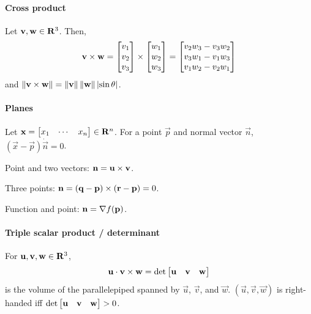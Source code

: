 \documentclass[10pt,landscape]{article}
\begin{document}
\begin{multicols*}{3}
\paragraph{Cross product}
Let $\mathbf{v}, \mathbf{w} \in \mathbf{R}^3$.
Then,
\begin{equation}
  \label{eq:crossproduct}
  \mathbf{v} \times \mathbf{w} = \begin{bmatrix} v_1 \\ v_2 \\ v_3 \end{bmatrix} \times \begin{bmatrix} w_1 \\ w_2 \\ w_3 \end{bmatrix} = \begin{bmatrix} v_2w_3 - v_3w_2 \\ v_3w_1 - v_1w_3 \\ v_1w_2 - v_2w_1 \end{bmatrix}
\end{equation}
and
$\left\lVert\mathbf{v} \times \mathbf{w}\right\rVert = \left\lVert\mathbf{v}\right\rVert\left\lVert\mathbf{w}\right\rVert\left\lvert\sin\theta\right\rvert$.

\paragraph{Planes}
Let $\mathbf{x} = \begin{bmatrix} x_1 & \cdots & x_n \end{bmatrix} \in \mathbf{R}^n$.
For a point $\vec p$ and normal vector $\vec n$, $(\vec x - \vec p) \dot \vec n = 0$.
\begin{list}{\textbullet}{\setlength{\itemsep}{0pt}}
\item Point and two vectors: $\mathbf{n} = \mathbf{u} \times \mathbf{v}$.
\item Three points: $\mathbf{n} = (\mathbf{q} - \mathbf{p}) \times (\mathbf{r} - \mathbf{p}) = 0$.
\item Function and point: $\mathbf{n} = \nabla f(\mathbf{p})$.
\end{list}

\paragraph{Triple scalar product / determinant}
For $\mathbf{u}, \mathbf{v}, \mathbf{w} \in \mathbf{R}^3$,
\begin{equation}
  \mathbf{u} \cdot \mathbf{v} \times \mathbf{w} = \det \begin{bmatrix} \mathbf{u} & \mathbf{v} & \mathbf{w} \end{bmatrix}
\end{equation}
is the volume of the parallelepiped spanned by $\vec u$, $\vec v$, and $\vec w$.
$(\vec u, \vec v, \vec w)$ is right-handed iff $\det \begin{bmatrix} \mathbf{u} & \mathbf{v} & \mathbf{w} \end{bmatrix} > 0$.


\end{multicols*}
\end{document}
